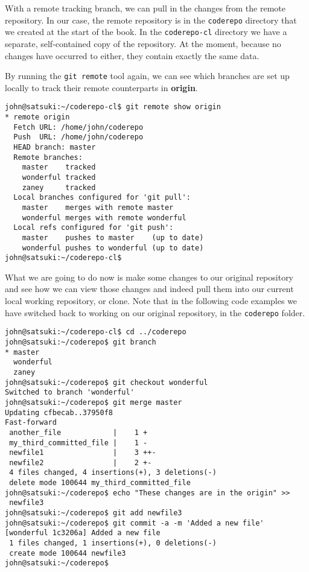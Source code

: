 With a remote tracking branch, we can pull in the changes from the remote repository.  In our case, the remote repository is in the \texttt{coderepo} directory that we created at the start of the book.  In the \texttt{coderepo-cl} directory we have a separate, self-contained copy of the repository.  At the moment, because no changes have occurred to either, they contain exactly the same data.

By running the \texttt{git remote} tool again, we can see which branches are set up locally to track their remote counterparts in \textbf{origin}.

\begin{Verbatim}[frame=leftline,framerule=1mm,fontsize=\relsize{-3}] 
john@satsuki:~/coderepo-cl$ git remote show origin
* remote origin
  Fetch URL: /home/john/coderepo
  Push  URL: /home/john/coderepo
  HEAD branch: master
  Remote branches:
    master    tracked
    wonderful tracked
    zaney     tracked
  Local branches configured for 'git pull':
    master    merges with remote master
    wonderful merges with remote wonderful
  Local refs configured for 'git push':
    master    pushes to master    (up to date)
    wonderful pushes to wonderful (up to date)
john@satsuki:~/coderepo-cl$ 
\end{Verbatim}

What we are going to do now is make some changes to our original repository and see how we can view those changes and indeed pull them into our current local working repository, or clone.  Note that in the following code examples we have switched back to working on our original repository, in the \texttt{coderepo} folder.

\begin{Verbatim}[frame=leftline,framerule=1mm,fontsize=\relsize{-3}] 
john@satsuki:~/coderepo-cl$ cd ../coderepo
john@satsuki:~/coderepo$ git branch
* master
  wonderful
  zaney
john@satsuki:~/coderepo$ git checkout wonderful 
Switched to branch 'wonderful'
john@satsuki:~/coderepo$ git merge master
Updating cfbecab..37950f8
Fast-forward
 another_file            |    1 +
 my_third_committed_file |    1 -
 newfile1                |    3 ++-
 newfile2                |    2 +-
 4 files changed, 4 insertions(+), 3 deletions(-)
 delete mode 100644 my_third_committed_file
john@satsuki:~/coderepo$ echo "These changes are in the origin" >> 
 newfile3
john@satsuki:~/coderepo$ git add newfile3
john@satsuki:~/coderepo$ git commit -a -m 'Added a new file'
[wonderful 1c3206a] Added a new file
 1 files changed, 1 insertions(+), 0 deletions(-)
 create mode 100644 newfile3
john@satsuki:~/coderepo$ 
\end{Verbatim}


